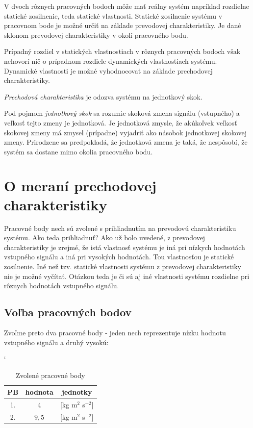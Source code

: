 \documentclass[a4paper, 10pt, ]{article}
\begin{document}
V dvoch rôznych pracovných bodoch môže mať reálny systém napríklad rozdielne statické zosilnenie, teda statické vlastnosti. Statické zosilnenie systému v pracovnom bode je možné určiť na základe prevodovej charakteristiky. Je dané sklonom prevodovej charakteristiky v okolí pracovného bodu.

Prípadný rozdiel v statických vlastnostiach v rôznych pracovných bodoch však nehovorí nič o prípadnom rozdiele dynamických vlastnostiach systému. Dynamické vlastnosti je možné vyhodnocovať na základe prechodovej charakteristiky.

\emph{Prechodová charakteristika} je odozva systému na jednotkový skok.

Pod pojmom \emph{jednotkový skok} sa rozumie skoková zmena signálu (vstupného) a veľkosť tejto zmeny je jednotková. Je jednotková zmysle, že akúkoľvek veľkosť skokovej zmeny má zmysel (prípadne) vyjadriť ako násobok jednotkovej skokovej zmeny. Prirodzene sa predpokladá, že jednotková zmena je taká, že nespôsobí, že systém sa dostane mimo okolia pracovného bodu.







\section{O meraní prechodovej charakteristiky}


Pracovné body nech sú zvolené s prihliadnutím na prevodovú charakteristiku systému. Ako teda prihliadnuť? Ako už bolo uvedené, z prevodovej charakteristiky je zrejmé, že istá vlastnosť systému je iná pri nízkych hodnotách vstupného signálu a iná pri vysokých hodnotách. Tou vlastnosťou je statické zosilnenie. Iné než tzv. statické vlastnosti systému z prevodovej charakteristiky nie je možné vyčítať. Otázkou teda je či sú aj iné vlastnosti systému rozdielne pri rôznych hodnotách vstupného signálu.

\subsection{Voľba pracovných bodov}


Zvoľme preto dva pracovné body - jeden nech reprezentuje nízku hodnotu vstupného signálu a druhý vysokú:

\begin{table}[!ht]
    \centering
	\catcode`

    \caption{Zvolené pracovné body}
    \label{Zvolené pracovné body}

    \begin{tabular}{ccc}
        \toprule
        PB & hodnota & jednotky \\
        \midrule
        1. & $4$ & [kg m$^2$ s$^{-2}$] \\
        2. & $9,5$ & [kg m$^2$ s$^{-2}$] \\
        \bottomrule
    \end{tabular}

\end{table}
\end{document}
